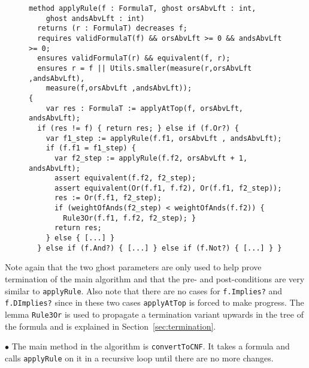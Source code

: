 \label{method:applyRule}
\begin{figure}[H]
\begin{Verbatim}[fontsize=\small, baselinestretch=0.1]
method applyRule(f : FormulaT, ghost orsAbvLft : int, 
    ghost andsAbvLft : int)
  returns (r : FormulaT) decreases f;
  requires validFormulaT(f) && orsAbvLft >= 0 && andsAbvLft >= 0;
  ensures validFormulaT(r) && equivalent(f, r);
  ensures r = f || Utils.smaller(measure(r,orsAbvLft ,andsAbvLft),
    measure(f,orsAbvLft ,andsAbvLft));
{ 
	var res : FormulaT := applyAtTop(f, orsAbvLft, andsAbvLft);
  if (res != f) { return res; } else if (f.Or?) {
    var f1_step := applyRule(f.f1, orsAbvLft , andsAbvLft);
    if (f.f1 = f1_step) {
      var f2_step := applyRule(f.f2, orsAbvLft + 1, andsAbvLft);
      assert equivalent(f.f2, f2_step);
      assert equivalent(Or(f.f1, f.f2), Or(f.f1, f2_step));
      res := Or(f.f1, f2_step);
      if (weightOfAnds(f2_step) < weightOfAnds(f.f2)) {
        Rule3Or(f.f1, f.f2, f2_step); }
      return res;
    } else { [...] }
  } else if (f.And?) { [...] } else if (f.Not?) { [...] } }
\end{Verbatim}
\end{figure}
Note again that the two ghost parameters are only used to help prove
termination of the main algorithm and that the pre- and
post-conditions are very similar to \texttt{applyRule}. Also note that
there are no cases for \texttt{f.Implies?} and \texttt{f.DImplies?}
since in these two cases \texttt{applyAtTop} is forced to make
progress. The lemma \texttt{Rule3Or} is used to propagate a
termination variant upwards in the tree of the formula and is
explained in Section~\ref{sec:termination}.

\( \bullet \) The main method in the algorithm is
\texttt{convertToCNF}. It takes a formula and calls \texttt{applyRule}
on it in a recursive loop until there are no more changes.

